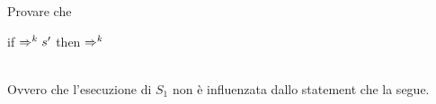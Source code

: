 {
  Provare che \\
  \centerline{if  $\Rightarrow^{k} s'$
  then  $\Rightarrow^{k}$ } \\
  Ovvero che l'esecuzione di $S_1$ non è influenzata dallo statement che la
  segue.
}
{
}
